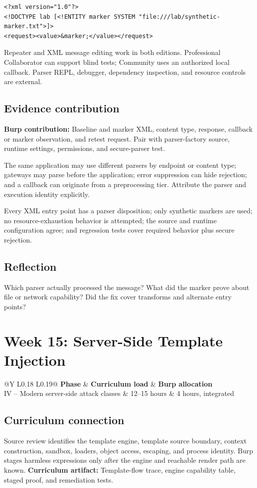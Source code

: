 \documentclass[11pt]{article}
\makeatletter
\newcommand{\weekheader}[5]{%
  \clearpage
  \section{Week #1: #2}
  \begin{tcolorbox}[colback=Navy,colframe=Navy,coltext=white]
    \begin{tabularx}{\linewidth}{@{}Y L{0.18\linewidth} L{0.19\linewidth}@{}}
      \textbf{Phase} & \textbf{Curriculum load} & \textbf{Burp allocation}\\
      #3 & #4 hours & #5 hours, integrated
    \end{tabularx}
  \end{tcolorbox}
}
\newcommand{\weekfield}[2]{%
  \Needspace{5\baselineskip}
  \subsection*{#1}
  #2
}
\newcommand{\curriculumartifact}[1]{\textbf{Curriculum artifact:} #1}
\newcommand{\burpevidence}[1]{\textbf{Burp contribution:} #1}
\makeatother
\begin{document}
\begin{lstlisting}[caption={Minimal XML marker structure}]
<?xml version="1.0"?>
<!DOCTYPE lab [<!ENTITY marker SYSTEM "file:///lab/synthetic-marker.txt">]>
<request><value>&marker;</value></request>
\end{lstlisting}

\begin{editionbox}
Repeater and XML message editing work in both editions. Professional Collaborator
can support blind tests; Community uses an authorized local callback. Parser REPL,
debugger, dependency inspection, and resource controls are external.
\end{editionbox}

\weekfield{Evidence contribution}{\burpevidence{Baseline and marker XML,
content type, response, callback or marker observation, and retest request.} Pair
with parser-factory source, runtime settings, permissions, and secure-parser test.}

\begin{troubleshootingbox}
The same application may use different parsers by endpoint or content type;
gateways may parse before the application; error suppression can hide rejection;
and a callback can originate from a preprocessing tier. Attribute the parser and
execution identity explicitly.
\end{troubleshootingbox}

\begin{checkpoints}
Every XML entry point has a parser disposition; only synthetic markers are used;
no resource-exhaustion behavior is attempted; the source and runtime configuration
agree; and regression tests cover required behavior plus secure rejection.
\end{checkpoints}

\weekfield{Reflection}{Which parser actually processed the message? What did the
marker prove about file or network capability? Did the fix cover transforms and
alternate entry points?}

\weekheader{15}{Server-Side Template Injection}{IV -- Modern server-side attack classes}{12--15}{4}

\weekfield{Curriculum connection}{Source review identifies the template engine,
template source boundary, context construction, sandbox, loaders, object access,
escaping, and process identity. Burp stages harmless expressions only after the
engine and reachable render path are known. \curriculumartifact{Template-flow
trace, engine capability table, staged proof, and remediation tests.}}
\end{document}
